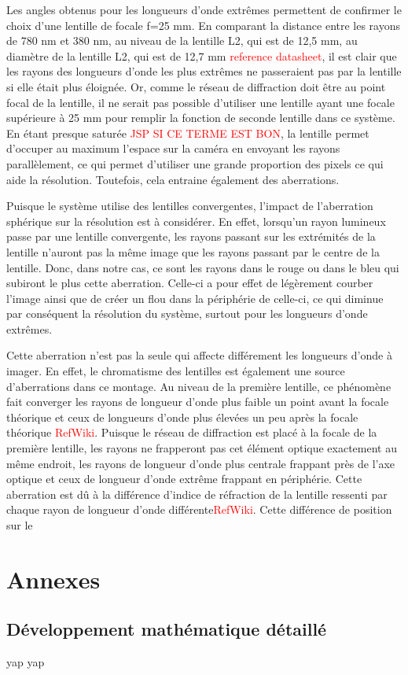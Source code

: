 \documentclass[conference]{IEEEtran}
\begin{document}
Les angles obtenus pour les longueurs d'onde extrêmes permettent de confirmer le choix d'une lentille de focale f=25 mm. En 
comparant la distance entre les rayons de 780 nm et 380 nm, au niveau de la lentille L2, qui est de 12,5 mm, au diamètre de
la lentille L2, qui est de 12,7 mm \textcolor{red}{reference datasheet}, il est clair que les rayons des longueurs d'onde 
les plus extrêmes ne passeraient pas par la lentille si elle était plus éloignée. Or, comme le réseau de diffraction doit être
au point focal de la lentille, il ne serait pas possible d'utiliser une lentille ayant une focale supérieure à 25 mm pour 
remplir la fonction de seconde lentille dans ce système. En étant presque saturée \textcolor{red}{JSP SI CE TERME EST BON}, 
la lentille permet d'occuper au maximum l'espace sur la caméra en envoyant les rayons parallèlement, ce qui permet d'utiliser
une grande proportion des pixels ce qui aide la résolution. Toutefois, cela entraine également des aberrations.

Puisque le système utilise des lentilles convergentes, l'impact de l'aberration sphérique \cite{edmund_optics_aberrations} sur la résolution est à considérer.
En effet, lorsqu'un rayon lumineux passe par une lentille convergente, les rayons passant sur les extrémités de la lentille
n'auront pas la même image que les rayons passant par le centre de la lentille. Donc, dans notre cas, ce sont les
rayons dans le rouge ou dans le bleu qui subiront le plus cette aberration. Celle-ci a pour effet de légèrement courber l'image
ainsi que de créer un flou dans la périphérie de celle-ci, ce qui diminue par conséquent la résolution du système, surtout pour les longueurs d'onde
extrêmes. 

Cette aberration n'est pas la seule qui affecte différement les longueurs d'onde à imager. En effet, le chromatisme des lentilles
est également une source d'aberrations dans ce montage. Au niveau de la première lentille, ce phénomène fait converger les rayons 
de longueur d'onde plus faible un point avant la focale théorique et ceux de longueurs d'onde plus élevées un peu après la focale
théorique \textcolor{red}{RefWiki}. Puisque le réseau de diffraction est placé à la focale de la première lentille, les rayons ne
frapperont pas cet élément optique exactement au même endroit, les rayons de longueur d'onde plus centrale frappant près de l'axe
optique et ceux de longueur d'onde extrême frappant en périphérie. Cette aberration est dû à la différence d'indice de réfraction 
de la lentille ressenti par chaque rayon de longueur d'onde différente\textcolor{red}{RefWiki}. Cette différence de position sur le 

\printbibliography

\clearpage

\section{Annexes}

\subsection{Développement mathématique détaillé}
yap yap


\clearpage
\end{document}
